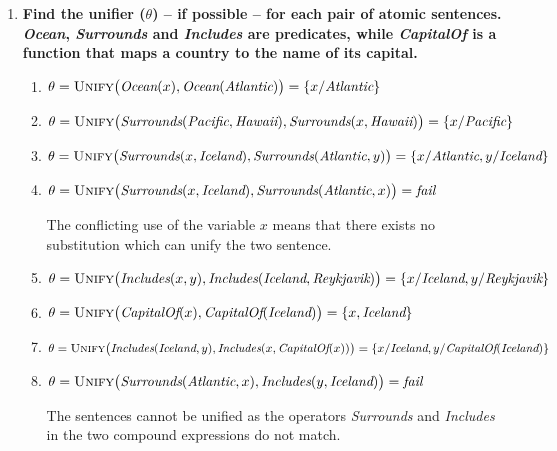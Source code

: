\begin{enumerate}

\item \textbf{Find the unifier ($\theta$) -- if possible -- for each pair of atomic sentences. \textit{Ocean}, \textit{Surrounds} and \textit{Includes} are predicates, while \textit{CapitalOf} is a function that maps a country to the name of its capital.}

\begin{enumerate}
\item
$\theta = \textsc{Unify}\big(\textit{Ocean}(x), \textit{Ocean}(\textit{Atlantic})\big) = \{x / \textit{Atlantic}\}$

\item
$\theta = \textsc{Unify}\big(\textit{Surrounds}(\textit{Pacific}, \textit{Hawaii}), \textit{Surrounds}(x, \textit{Hawaii})\big) = \{x / \textit{Pacific}\}$

\item
$\theta = \textsc{Unify}\big(\textit{Surrounds}(x, \textit{Iceland}), \textit{Surrounds}(\textit{Atlantic}, y)\big) = \{x / \textit{Atlantic}, y / \textit{Iceland}\}$

\item
$\theta = \textsc{Unify}\big(\textit{Surrounds}(x, \textit{Iceland}), \textit{Surrounds}(\textit{Atlantic}, x)\big) = \textit{fail}$

The conflicting use of the variable $x$ means that there exists no substitution which can unify the two sentence.

\item
$\theta = \textsc{Unify}\big(\textit{Includes}(x, y), \textit{Includes}(\textit{Iceland}, \textit{Reykjavik})\big) = \{x / \textit{Iceland}, y / \textit{Reykjavik}\}$

\item
$\theta = \textsc{Unify}\big(\textit{CapitalOf}(x), \textit{CapitalOf}(\textit{Iceland})\big) = \{x, \textit{Iceland}\}$

\item
$\theta = \textsc{Unify}\big(\textit{Includes}(\textit{Iceland}, y), \textit{Includes}(x, \textit{CapitalOf}(x))\big) = \{x / \textit{Iceland}, y / \textit{CapitalOf}(\textit{Iceland})\}$

\item
$\theta = \textsc{Unify}\big(\textit{Surrounds}(\textit{Atlantic}, x), \textit{Includes}(y, \textit{Iceland})\big) = \textit{fail}$

The sentences cannot be unified as the operators \textit{Surrounds} and \textit{Includes} in the two compound expressions do not match.

\end{enumerate}

\end{enumerate}



